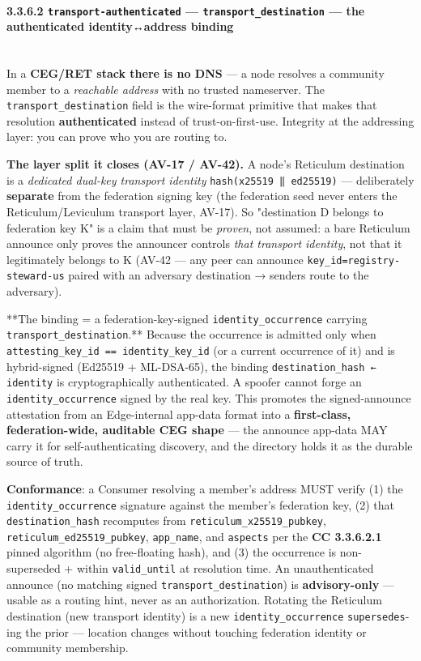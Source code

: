 \documentclass[11pt]{article}
\begin{document}
\paragraph{3.3.6.2 \texttt{transport-authenticated} — \texttt{transport\_destination} — the authenticated identity↔address binding}\mbox{}\\


In a \textbf{CEG/RET stack there is no DNS} — a node resolves a community member to a \textit{reachable address} with no trusted nameserver. The \texttt{transport\_destination} field is the wire-format primitive that makes that resolution \textbf{authenticated} instead of trust-on-first-use. Integrity at the addressing layer: you can prove who you are routing to.


\textbf{The layer split it closes (AV-17 / AV-42).} A node's Reticulum destination is a \textit{dedicated dual-key transport identity} \texttt{hash(x25519 ‖ ed25519)} — deliberately \textbf{separate} from the federation signing key (the federation seed never enters the Reticulum/Leviculum transport layer, AV-17). So "destination D belongs to federation key K" is a claim that must be \textit{proven}, not assumed: a bare Reticulum announce only proves the announcer controls \textit{that transport identity}, not that it legitimately belongs to K (AV-42 — any peer can announce \texttt{key\_id=registry-steward-us} paired with an adversary destination → senders route to the adversary).


**The binding = a federation-key-signed \texttt{identity\_occurrence} carrying \texttt{transport\_destination}.** Because the occurrence is admitted only when \texttt{attesting\_key\_id == identity\_key\_id} (or a current occurrence of it) and is hybrid-signed (Ed25519 + ML-DSA-65), the binding \texttt{destination\_hash ← identity} is cryptographically authenticated. A spoofer cannot forge an \texttt{identity\_occurrence} signed by the real key. This promotes the signed-announce attestation from an Edge-internal app-data format into a \textbf{first-class, federation-wide, auditable CEG shape} — the announce app-data MAY carry it for self-authenticating discovery, and the directory holds it as the durable source of truth.


\textbf{Conformance}: a Consumer resolving a member's address MUST verify (1) the \texttt{identity\_occurrence} signature against the member's federation key, (2) that \texttt{destination\_hash} recomputes from \texttt{reticulum\_x25519\_pubkey}, \texttt{reticulum\_ed25519\_pubkey}, \texttt{app\_name}, and \texttt{aspects} per the \textbf{CC 3.3.6.2.1} pinned algorithm (no free-floating hash), and (3) the occurrence is non-superseded + within \texttt{valid\_until} at resolution time. An unauthenticated announce (no matching signed \texttt{transport\_destination}) is \textbf{advisory-only} — usable as a routing hint, never as an authorization. Rotating the Reticulum destination (new transport identity) is a new \texttt{identity\_occurrence} \texttt{supersedes}-ing the prior — location changes without touching federation identity or community membership.
\end{document}
